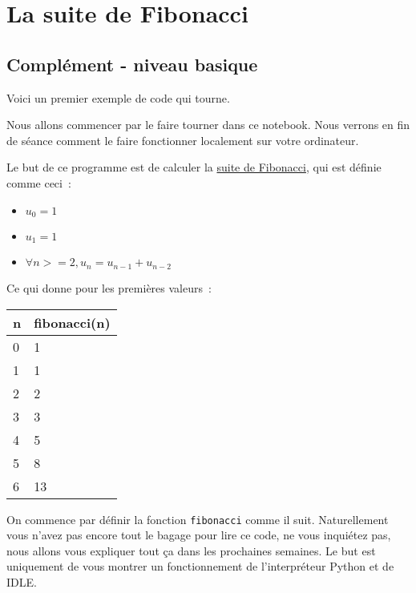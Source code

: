     
    
    
    

    

    \hypertarget{la-suite-de-fibonacci}{%
\section{La suite de Fibonacci}\label{la-suite-de-fibonacci}}

    \hypertarget{compluxe9ment---niveau-basique}{%
\subsection{Complément - niveau
basique}\label{compluxe9ment---niveau-basique}}

    Voici un premier exemple de code qui tourne.

Nous allons commencer par le faire tourner dans ce notebook. Nous
verrons en fin de séance comment le faire fonctionner localement sur
votre ordinateur.

    Le but de ce programme est de calculer la
\href{https://fr.wikipedia.org/wiki/Suite_de_Fibonacci}{suite de
Fibonacci}, qui est définie comme ceci~:

\begin{itemize}
\tightlist
\item
  \(u_0 = 1\)
\item
  \(u_1 = 1\)
\item
  \(\forall n >= 2, u_n = u_{n-1} + u_{n-2}\)
\end{itemize}

Ce qui donne pour les premières valeurs~:

    \begin{longtable}[]{@{}ll@{}}
\toprule
n & fibonacci(n)\tabularnewline
\midrule
\endhead
0 & 1\tabularnewline
1 & 1\tabularnewline
2 & 2\tabularnewline
3 & 3\tabularnewline
4 & 5\tabularnewline
5 & 8\tabularnewline
6 & 13\tabularnewline
\bottomrule
\end{longtable}

    On commence par définir la fonction \texttt{fibonacci} comme il suit.
Naturellement vous n'avez pas encore tout le bagage pour lire ce code,
ne vous inquiétez pas, nous allons vous expliquer tout ça dans les
prochaines semaines. Le but est uniquement de vous montrer un
fonctionnement de l'interpréteur Python et de IDLE.

